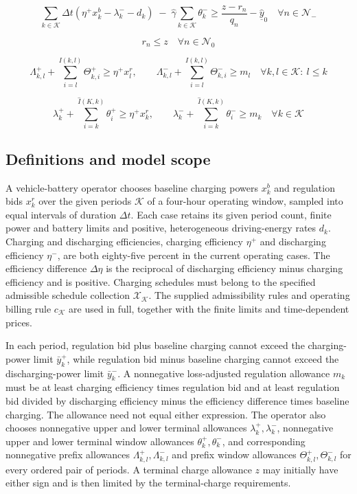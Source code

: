 \documentclass[10pt]{article}
\begin{document}
\begin{equation}
\sum_{k \in \mathcal K} \Delta t \left( \eta^+x_k^b - \lambda_k^- - d_k \right)
\;-\; \hat{\gamma}\sum_{k \in \mathcal K}\theta_k^-
\ge \frac{z - r_n}{q_n} - \hat{\underline y}_0
\quad \forall n \in \mathcal N_-
\tag{32}
\end{equation}

\begin{equation}
r_n \le z
\quad \forall n \in \mathcal N_0
\tag{33}
\end{equation}

\begin{equation}
\Lambda_{k,l}^+ + \sum_{i=l}^{I(k,l)} \Theta_{k,i}^+ \ge \eta^+ x_l^r,\qquad
\Lambda_{k,l}^- + \sum_{i=l}^{I(k,l)} \Theta_{k,i}^- \ge m_l
\quad \forall k,l \in \mathcal K:\ l \le k
\tag{34}
\end{equation}

\begin{equation}
\lambda_k^+ + \sum_{i=k}^{\hat I(K,k)} \theta_i^+ \ge \eta^+ x_k^r,\qquad
\lambda_k^- + \sum_{i=k}^{\hat I(K,k)} \theta_i^- \ge m_k
\quad \forall k \in \mathcal K
\tag{35}
\end{equation}

\subsection*{Definitions and model scope}
A vehicle-battery operator chooses baseline charging powers $x_k^b$ and regulation bids $x_k^r$ over the given periods $\mathcal K$ of a four-hour operating window, sampled into equal intervals of duration $\Delta t$. Each case retains its given period count, finite power and battery limits and positive, heterogeneous driving-energy rates $d_k$. Charging and discharging efficiencies, charging efficiency $\eta^+$ and discharging efficiency $\eta^-$, are both eighty-five percent in the current operating cases. The efficiency difference $\Delta\eta$ is the reciprocal of discharging efficiency minus charging efficiency and is positive. Charging schedules must belong to the specified admissible schedule collection $\mathcal X_{\mathcal K}$. The supplied admissibility rules and operating billing rule $c_{\mathcal K}$ are used in full, together with the finite limits and time-dependent prices.

In each period, regulation bid plus baseline charging cannot exceed the charging-power limit $\bar y_k^+$, while regulation bid minus baseline charging cannot exceed the discharging-power limit $\bar y_k^-$. A nonnegative loss-adjusted regulation allowance $m_k$ must be at least charging efficiency times regulation bid and at least regulation bid divided by discharging efficiency minus the efficiency difference times baseline charging. The allowance need not equal either expression. The operator also chooses nonnegative upper and lower terminal allowances $\lambda_k^+,\lambda_k^-$, nonnegative upper and lower terminal window allowances $\theta_k^+,\theta_k^-$, and corresponding nonnegative prefix allowances $\Lambda_{k,l}^+,\Lambda_{k,l}^-$ and prefix window allowances $\Theta_{k,l}^+,\Theta_{k,l}^-$ for every ordered pair of periods. A terminal charge allowance $z$ may initially have either sign and is then limited by the terminal-charge requirements.
\end{document}
